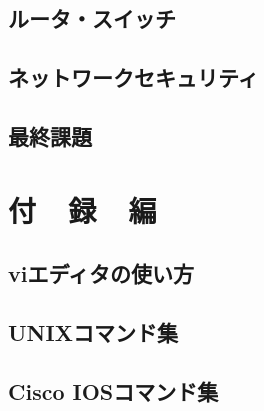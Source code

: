 \documentclass[10pt]{text2002}
\begin{document}
\chapter{ルータ・スイッチ}\label{ch:patch}
\def\chaprouter{03_1_router_sw/}

\def\chapsw{03_1_router_sw/}


\chapter{ネットワークセキュリティ}
\def\chapfw{03_2_firewall/}


\chapter{最終課題}
\def\chapfinal{0Z_final/}



\part{付~~録~~編}\label{part:appendix}
\appendix
\chapter{viエディタの使い方}\label{etc:vi}


\chapter{UNIXコマンド集}\label{etc:unixcmd}

%
%
%
\chapter{Cisco IOSコマンド集}\label{etc:ioscmd}


%

%

%
\end{document}
